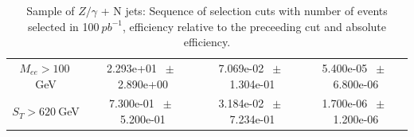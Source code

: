 \begin{table}[htbp]
\begin{center}
\begin{tabular}{|c|c|c|c|}
          $M_{ee}>100~$GeV          &           2.293e+01          $~\pm~$          2.890e+00           &           7.069e-02          $~\pm~$          1.304e-01           &           5.400e-05          $~\pm~$          6.800e-06          \\          
          $ S_T>620~$GeV           &           7.300e-01          $~\pm~$          5.200e-01           &           3.184e-02          $~\pm~$          7.234e-01           &           1.700e-06          $~\pm~$          1.200e-06          \\          
          \hline\hline 
\end{tabular} 
\end{center} 
\caption{Sample of $Z/\gamma$ + N jets: Sequence of selection cuts with number of events selected in 100$~pb^{-1}$, efficiency relative to the preceeding cut and absolute efficiency.} 
\label{tab:effic-Z} 
\end{table} 

